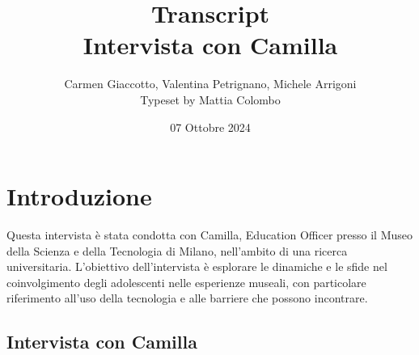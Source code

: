 \documentclass{article}
\title{Transcript \\ Intervista con Camilla}
\author{Carmen Giaccotto, Valentina Petrignano, Michele Arrigoni \\ Typeset by Mattia Colombo}
\date{07 Ottobre 2024}
\begin{document}
\maketitle


\section{Introduzione}
Questa intervista è stata condotta con Camilla, Education Officer presso il Museo della Scienza e della Tecnologia di Milano, nell'ambito di una ricerca universitaria. L'obiettivo dell'intervista è esplorare le dinamiche e le sfide nel coinvolgimento degli adolescenti nelle esperienze museali, con particolare riferimento all'uso della tecnologia e alle barriere che possono incontrare.



\subsection{\textcolor{subsectioncolor}{Intervista con Camilla}}
\end{document}

